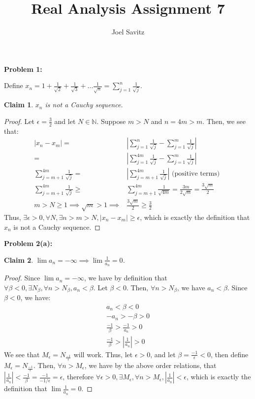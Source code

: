 \documentclass{article}
\title{Real Analysis Assignment 7}
\author{Joel Savitz}
\newcommand{\nats}{\ensuremath{\mathbb{N}}}
\newcommand{\eps}{\ensuremath{\epsilon}}
\newtheorem{clm}{Claim}
\begin{document}
\maketitle

\textbf{Problem 1:}

Define $x_n = 1 + \frac{1}{\sqrt{2}} + \frac{1}{\sqrt{3}} + ... \frac{1}{\sqrt{n}} = \sum_{j=1}^{n} \frac{1}{\sqrt{j}}$.

\begin{clm}
	$x_n$ is not a Cauchy sequence.
\end{clm}

\begin{proof}
	Let $\eps = \frac{3}{2}$ and let $N \in \nats$.
	Suppose $m > N$ and $n = 4m > m$.
	Then, we see that:
	\begin{align}
		|x_n - x_m| = & |\sum_{j=1}^{n} \frac{1}{\sqrt{j}} - \sum_{j=1}^{m}\frac{1}{\sqrt{j}}| \\
			    = & |\sum_{j=1}^{4m} \frac{1}{\sqrt{j}} - \sum_{j=1}^{m}\frac{1}{\sqrt{j}}| \\
		\sum_{j=m+1}^{4m} \frac{1}{\sqrt{j}} = & |\sum_{j=m+1}^{4m} \frac{1}{\sqrt{j}}| \textrm{ (positive terms) } \\ 
		\sum_{j=m+1}^{4m} \frac{1}{\sqrt{j}} \geq & \sum_{j=m+1}^{4m} \frac{1}{\sqrt{4m}}
		= \frac{3m}{2\sqrt{m}} = \frac{3\sqrt{m}}{2} \\
		m > N \geq 1 \implies \sqrt{m} > 1 \implies & \frac{3\sqrt{m}}{2} \geq \frac{3}{2}
	\end{align}
	Thus,
	$\exists \eps > 0, \forall N, \exists n > m > N, |x_n - x_m| \geq \eps$,
	which is exactly the definition that $x_n$ is not a Cauchy sequence.
\end{proof}

\textbf{Problem 2(a):}

\begin{clm}
	$\lim a_n = -\infty \implies \lim \frac{1}{a_n} = 0$.
\end{clm}

\begin{proof}
	Since $\lim a_n = -\infty$,
	we have by definition
	that $\forall \beta < 0, \exists N_\beta, \forall n > N_\beta, a_n < \beta$.
	Let $\beta < 0$. Then, $\forall n > N_\beta$, we have $a_n < \beta$.
	Since $\beta < 0$, we have:
	\begin{align}
		a_n < \beta < 0 \\
		-a_n > -\beta > 0 \\
		\frac{-1}{\beta} > \frac{-1}{a_n} > 0 \\
		\frac{-1}{\beta} > |\frac{1}{a_n}| > 0
	\end{align}
	We see that $M_\eps = N_\frac{-1}{\eps}$ will work.
	Thus, let $\eps > 0$,
	and let $\beta = \frac{-1}{\eps} < 0$,
	then define
	$M_\eps = N_\frac{-1}{\eps}$.
	Then, $\forall n > M_\eps$,
	we have by the above order relations,
	that $|\frac{1}{a_n}| < \frac{-1}{\beta} = \frac{-1}{-1/\eps} = \eps$,
	therefore $\forall \eps > 0,
	\exists M_\eps,
	\forall n > M_\eps,
	|\frac{1}{a_n}| < \eps$,
	which is exactly the definition
	that $\lim \frac{1}{a_n} = 0$.
\end{proof}
\end{document}
